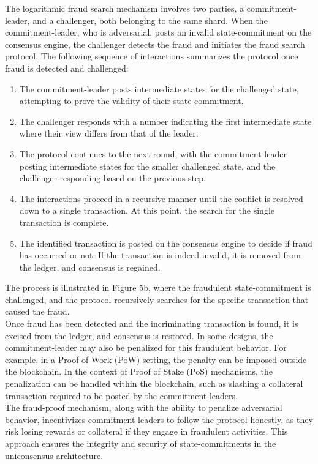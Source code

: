 \documentclass{report}
\begin{document}
\begin{enumerate}
	The logarithmic fraud search mechanism involves two parties, a commitment-leader, and a challenger, both belonging to the same shard. When the commitment-leader, who is adversarial, posts an invalid state-commitment on the consensus engine, the challenger detects the fraud and initiates the fraud search protocol. The following sequence of interactions summarizes the protocol once fraud is detected and challenged:\\
	\begin{enumerate}
		\item The commitment-leader posts intermediate states for the challenged state, attempting to prove the validity of their state-commitment.
		\item The challenger responds with a number indicating the first intermediate state where their view differs from that of the leader.
		\item The protocol continues to the next round, with the commitment-leader posting intermediate states for the smaller challenged state, and the challenger responding based on the previous step.
		\item The interactions proceed in a recursive manner until the conflict is resolved down to a single transaction. At this point, the search for the single transaction is complete.
		\item The identified transaction is posted on the consensus engine to decide if fraud has occurred or not. If the transaction is indeed invalid, it is removed from the ledger, and consensus is regained.
	\end{enumerate}
	The process is illustrated in Figure 5b, where the fraudulent state-commitment is challenged, and the protocol recursively searches for the specific transaction that caused the fraud.\\
	Once fraud has been detected and the incriminating transaction is found, it is excised from the ledger, and consensus is restored. In some designs, the commitment-leader may also be penalized for this fraudulent behavior. For example, in a Proof of Work (PoW) setting, the penalty can be imposed outside the blockchain. In the context of Proof of Stake (PoS) mechanisms, the penalization can be handled within the blockchain, such as slashing a collateral transaction required to be posted by the commitment-leaders.\\
	The fraud-proof mechanism, along with the ability to penalize adversarial behavior, incentivizes commitment-leaders to follow the protocol honestly, as they risk losing rewards or collateral if they engage in fraudulent activities. This approach ensures the integrity and security of state-commitments in the uniconsensus architecture.
\end{enumerate} 
\end{document}
